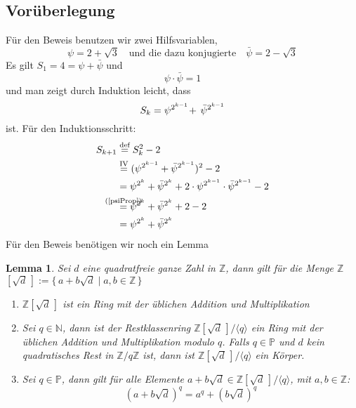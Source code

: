 \documentclass{article}
\newtheorem{lemma}{Lemma}
\newcommand{\Prime}{\ensuremath{\mathbb{P}}}
\newcommand{\Nature}{\ensuremath{\mathbb{N}}}
\newcommand{\Integer}{\ensuremath{\mathbb{Z}}}
\newcommand{\ZAdjdModq}{\ensuremath{\Integer[\sqrt{d}\,]/\langle q \rangle}}
\newcommand{\Zmodq}{\ensuremath{\Integer/q\Integer}}
\begin{document}
\subsection{Vor\"{u}berlegung}
F\"{u}r den Beweis benutzen wir zwei Hilfsvariablen,
\[
	\psi = 2 + \sqrt{3}\quad \mbox{und die dazu konjugierte}\quad \bar{\psi} = 2- \sqrt{3}
\]
Es gilt $S_1 = 4 = \psi + \bar{\psi}$ und 
\begin{equation}\label{psiProp}
	\psi \cdot \bar{\psi} = 1
\end{equation}
und man zeigt durch Induktion leicht, dass 
\begin{equation}\label{Skpsi}
S_k \nobreak = \nobreak \psi^{2^{k-1}} \!+ \, \bar{\psi}^{2^{k-1}}
\end{equation} ist. F\"{u}r den Induktionsschritt:
\begin{align*}
	S_{k+1} &\overset{\text{def}}{=} S_{k}^2 - 2\\
			&\overset{\text{IV}}{=} (\psi^{2^{k-1}} + \bar{\psi}^{2^{k-1}})^2 - 2\\
			&= \psi^{2^{k}} + \bar{\psi}^{2^{k}} + 2\cdot \psi^{2^{k-1}} \cdot \bar{\psi}^{2^{k-1}} - 2\\
			&\overset{\mathclap{\text{(\ref{psiProp})}}}{=} \psi^{2^{k}} + \bar{\psi}^{2^{k}} + 2 - 2\\
			&= \psi^{2^{k}} + \bar{\psi}^{2^{k}}
\end{align*}
F\"{u}r den Beweis ben\"{o}tigen wir noch ein Lemma
\begin{lemma}\label{restRing}
	Sei $d$ eine quadratfreie ganze Zahl in \Integer, dann gilt 
	f\"{u}r die Menge \Integer$[\sqrt{d}\,]:=\{\, a + b\sqrt{d} \mid a,b\in \Integer \,\}$
	\begin{enumerate}
		\item \Integer$[\sqrt{d}\,]$ ist ein Ring mit der \"{u}blichen Addition und Multiplikation
		\item Sei $q \in \Nature$, dann ist der Restklassenring $\ZAdjdModq$ ein Ring mit der \"{u}blichen Addition und Multiplikation modulo $q$. Falls $q \in \Prime$  und $d$ kein quadratisches Rest in $\Zmodq$ ist, dann ist $\ZAdjdModq$ ein K\"{o}rper.
		\item Sei $q \in \Prime$, dann gilt f\"{u}r alle Elemente $a + b\sqrt{d} \in \ZAdjdModq$, mit $a,b\in \Integer$:
		\[
			(a + b\sqrt{d})^q  = a^q + (b\sqrt{d})^q
		\]
	\end{enumerate}
\end{lemma}
\end{document}
